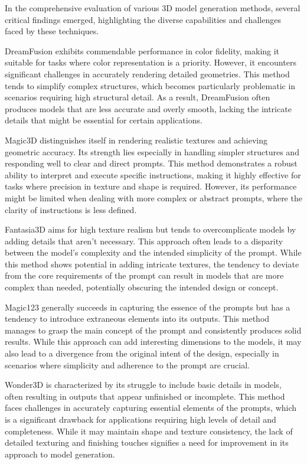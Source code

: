 In the comprehensive evaluation of various 3D model generation methods, several critical findings emerged, highlighting the diverse capabilities and challenges faced by these techniques. 

DreamFusion exhibits commendable performance in color fidelity, making it suitable for tasks where color representation is a priority. However, it encounters significant challenges in accurately rendering detailed geometries. This method tends to simplify complex structures, which becomes particularly problematic in scenarios requiring high structural detail. As a result, DreamFusion often produces models that are less accurate and overly smooth, lacking the intricate details that might be essential for certain applications.

Magic3D distinguishes itself in rendering realistic textures and achieving geometric accuracy. Its strength lies especially in handling simpler structures and responding well to clear and direct prompts. This method demonstrates a robust ability to interpret and execute specific instructions, making it highly effective for tasks where precision in texture and shape is required. However, its performance might be limited when dealing with more complex or abstract prompts, where the clarity of instructions is less defined.

Fantasia3D aims for high texture realism but tends to overcomplicate models by adding details that aren't necessary. This approach often leads to a disparity between the model's complexity and the intended simplicity of the prompt. While this method shows potential in adding intricate textures, the tendency to deviate from the core requirements of the prompt can result in models that are more complex than needed, potentially obscuring the intended design or concept.

Magic123 generally succeeds in capturing the essence of the prompts but has a tendency to introduce extraneous elements into its outputs. This method manages to grasp the main concept of the prompt and consistently produces solid results. While this approach can add interesting dimensions to the models, it may also lead to a divergence from the original intent of the design, especially in scenarios where simplicity and adherence to the prompt are crucial.

Wonder3D is characterized by its struggle to include basic details in models, often resulting in outputs that appear unfinished or incomplete. This method faces challenges in accurately capturing essential elements of the prompts, which is a significant drawback for applications requiring high levels of detail and completeness. While it may maintain shape and texture consistency, the lack of detailed texturing and finishing touches signifies a need for improvement in its approach to model generation.

